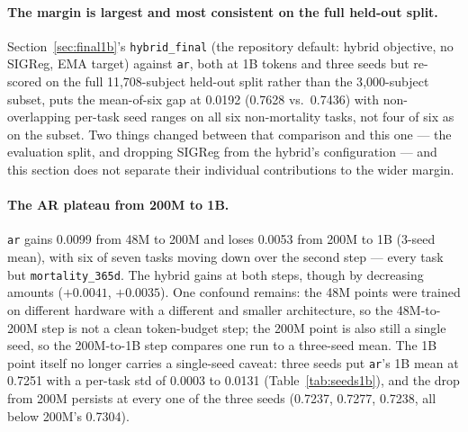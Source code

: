 \documentclass[11pt,a4paper]{article}
\newcommand{\code}[1]{\texttt{\small #1}}
\begin{document}
\paragraph{The margin is largest and most consistent on the full held-out
split.} Section~\ref{sec:final1b}'s \code{hybrid\_final} (the repository
default: hybrid objective, no SIGReg, EMA target) against \code{ar}, both at
1B tokens and three seeds but re-scored on the full 11{,}708-subject held-out
split rather than the 3{,}000-subject subset, puts the mean-of-six gap at
0.0192 (0.7628 vs.\ 0.7436) with non-overlapping per-task seed ranges on all
six non-mortality tasks, not four of six as on the subset. Two things changed
between that comparison and this one --- the evaluation split, and dropping
SIGReg from the hybrid's configuration --- and this section does not
separate their individual contributions to the wider margin.

\paragraph{The AR plateau from 200M to 1B.}
\code{ar} gains 0.0099 from 48M to 200M and loses 0.0053 from 200M to 1B
(3-seed mean), with six of seven tasks moving down over the second step ---
every task but \code{mortality\_365d}. The hybrid gains at both steps, though
by decreasing amounts ($+0.0041$, $+0.0035$). One confound remains: the 48M
points were trained on different hardware with a different and smaller
architecture, so the 48M-to-200M step is not a clean token-budget step; the
200M point is also still a single seed, so the 200M-to-1B step compares one
run to a three-seed mean. The 1B point itself no longer carries a
single-seed caveat: three seeds put \code{ar}'s 1B mean at 0.7251 with a
per-task std of 0.0003 to 0.0131 (Table~\ref{tab:seeds1b}), and the drop from
200M persists at every one of the three seeds (0.7237, 0.7277, 0.7238, all
below 200M's 0.7304).
\end{document}
